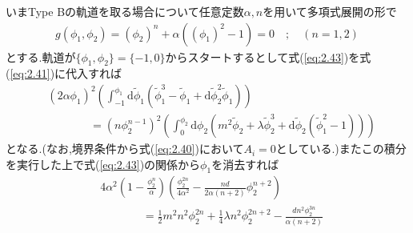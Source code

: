 \documentclass[dvipdfmx,11pt,a4paper]{jsbook}
\begin{document}
いまType Bの軌道を取る場合について任意定数$\alpha,n$を用いて多項式展開の形で
\begin{align}
    g\left(\phi_{1}, \phi_{2}\right)=\left(\phi_{2}\right)^{n}+\alpha\left(\left(\phi_{1}\right)^{2}-1\right)=0\quad ; \quad (n=1,2)\label{eq:2.43}
\end{align}
とする.軌道が$\{\phi_1,\phi_2\}=\{-1,0\}$からスタートするとして式(\ref{eq:2.43})を式(\ref{eq:2.41})に代入すれば
\begin{align}
     & \left(2 \alpha \phi_{1}\right)^{2}\left(\int_{-1}^{\phi_{1}} \mathrm{d} \tilde{\phi}_{1}\left(\tilde{\phi}_{1}^{3}-\tilde{\phi}_{1}+\mathrm{d} \tilde{\phi}_{2}^{2} \tilde{\phi}_{1}\right)\right)\nonumber                                                \\
     & \qquad\ \ \ \ \ \ \ \ =\left(n \phi_{2}^{n-1}\right)^{2}\left(\int_{0}^{\phi_{2}} \mathrm{d} \phi_{2}\left(m^{2} \tilde{\phi}_{2}+\lambda \tilde{\phi}_{2}^{3}+\mathrm{d} \tilde{\phi}_{2}\left(\tilde{\phi}_{1}^{2}-1\right)\right)\right)\label{eq:2.44}
\end{align}
となる.(なお,境界条件から式(\ref{eq:2.40})において$A_i=0$としている.)またこの積分を実行した上で式(\ref{eq:2.43})の関係から$\phi_1$を消去すれば
\begin{align}
     & 4 \alpha^{2}\left(1-\frac{\phi_{2}^{n}}{\alpha}\right)\left(\frac{\phi_{2}^{2 n}}{4 \alpha^{2}}-\frac{n d}{2 \alpha(n+2)} \phi_{2}^{n+2}\right)\nonumber           \\
     & \qquad\ \ \ \ \ \ \ \ =\frac{1}{2} m^{2} n^{2} \phi_{2}^{2 n}+\frac{1}{4} \lambda n^{2} \phi_{2}^{2 n+2}-\frac{d n^{2} \phi_{2}^{3 n}}{\alpha(n+2)}\label{eq:2.45}
\end{align}
\end{document}

